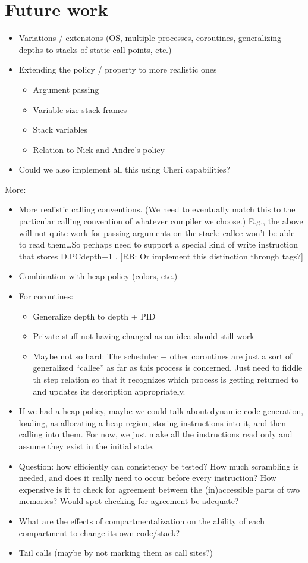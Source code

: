 \documentclass[conference]{IEEEtran}
\begin{document}
\iftext
\section{Future work}

\begin{itemize}
\item Variations / extensions (OS, multiple processes, coroutines, generalizing depths to stacks of static call points, etc.)
\item Extending the policy / property to more realistic ones
\begin{itemize}
\item Argument passing
\item Variable-size stack frames
\item Stack variables
\item Relation to Nick and Andre’s policy
\end{itemize}
\item Could we also implement all this using Cheri capabilities?
\end{itemize}

More:
\begin{itemize}
\item More realistic calling conventions.  (We need to eventually match this to the particular calling convention of whatever compiler we choose.)  E.g., the above will not quite work for passing arguments on the stack: callee won’t be able to read them…So perhaps need to support a special kind of write instruction that stores D.PCdepth+1 . [RB: Or implement this distinction through tags?]
\item Combination with heap policy (colors, etc.)
\item For coroutines:
\begin{itemize}
\item Generalize depth to depth + PID
\item Private stuff not having changed as an idea should still work
\item Maybe not so hard: The scheduler + other coroutines are just a sort of generalized “callee” as far as this process is concerned.  Just need to fiddle th step relation so that it recognizes which process is getting returned to and updates its description appropriately.
\end{itemize}
\item If we had a heap policy, maybe we could talk about dynamic code generation, loading, as allocating a heap region, storing instructions into it, and then calling into them.  For now, we just make all the instructions read only and assume they exist in the initial state.
\item Question: how efficiently can consistency be tested? How much scrambling is needed, and does it really need to occur before every instruction? How expensive is it to check for agreement between the (in)accessible parts of two memories?  Would spot checking for agreement be adequate?]
\item What are the effects of compartmentalization on the ability of each compartment to change its own code/stack?
\item Tail calls (maybe by not marking them as call sites?)
\end{itemize}
\end{document}
